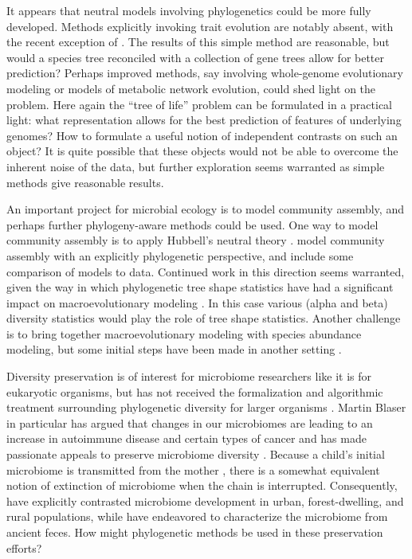 \documentclass{amsart}
\begin{document}
It appears that neutral models involving phylogenetics could be more fully developed.
Methods explicitly invoking trait evolution are notably absent, with the recent exception of \citep{langille2013predictive}.
The results of this simple method are reasonable, but would a species tree reconciled with a collection of gene trees allow for better prediction?
Perhaps improved methods, say involving whole-genome evolutionary modeling or models of metabolic network evolution, could shed light on the problem.
Here again the ``tree of life'' problem can be formulated in a practical light: what representation allows for the best prediction of features of underlying genomes?
How to formulate a useful notion of independent contrasts \citep{felsenstein1985phylogenies} on such an object?
It is quite possible that these objects would not be able to overcome the inherent noise of the data, but further exploration seems warranted as simple methods give reasonable results.

An important project for microbial ecology is to model community assembly, and perhaps further phylogeny-aware methods could be used.
One way to model community assembly is to apply Hubbell's neutral theory \citep{fierer2012animalcules,costello2012application}.
\citet{o2012phylogenetic} model community assembly with an explicitly phylogenetic perspective, and include some comparison of models to data.
Continued work in this direction seems warranted, given the way in which phylogenetic tree shape statistics have had a significant impact on macroevolutionary modeling \citep{mooers1997inferring,aldous2011five}.
In this case various (alpha and beta) diversity statistics would play the role of tree shape statistics.
Another challenge is to bring together macroevolutionary modeling with species abundance modeling, but some initial steps have been made in another setting \citep{lambert2013predicting}.

Diversity preservation is of interest for microbiome researchers like it is for eukaryotic organisms, but has not received the formalization and algorithmic treatment surrounding phylogenetic diversity for larger organisms \citep{hartmann2006maximizing,pardi2007resource}.
Martin Blaser in particular has argued that changes in our microbiomes are leading to an increase in autoimmune disease and certain types of cancer \citep[reviewed in][]{cho2012human} and has made passionate appeals to preserve microbiome diversity \citep{blaser2011antibiotic}.
Because a child's initial microbiome is transmitted from the mother \citep[reviewed in][]{funkhouser2013mom}, there is a somewhat equivalent notion of extinction of microbiome when the chain is interrupted.
Consequently, \citet{yatsunenko2012human} have explicitly contrasted microbiome development in urban, forest-dwelling, and rural populations, while \citet{tito2012insights} have endeavored to characterize the microbiome from ancient feces.
How might phylogenetic methods be used in these preservation efforts?
\end{document}
